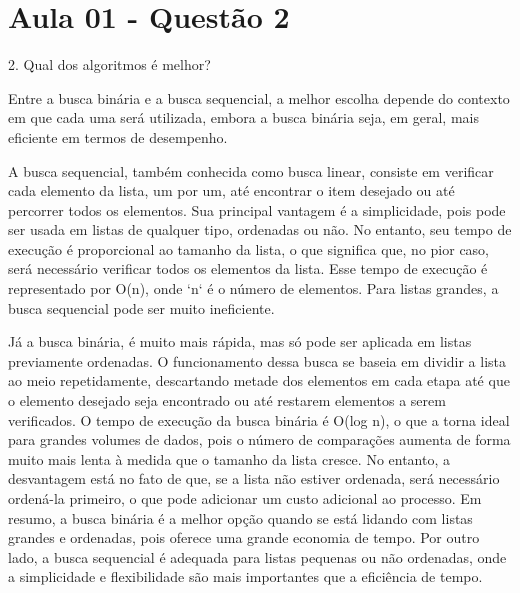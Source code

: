 \section{Aula 01 - Questão 2}

2. Qual dos algoritmos é melhor?

Entre a busca binária e a busca sequencial, a melhor escolha depende do contexto em que cada uma será utilizada, embora a busca binária seja, em geral, mais eficiente em termos de desempenho.

A busca sequencial, também conhecida como busca linear, consiste em verificar cada elemento da lista, um por um, até encontrar o item desejado ou até percorrer todos os elementos. Sua principal vantagem é a simplicidade, pois pode ser usada em listas de qualquer tipo, ordenadas ou não. No entanto, seu tempo de execução é proporcional ao tamanho da lista, o que significa que, no pior caso, será necessário verificar todos os elementos da lista. Esse tempo de execução é representado por O(n), onde `n` é o número de elementos. Para listas grandes, a busca sequencial pode ser muito ineficiente.

Já a busca binária, é muito mais rápida, mas só pode ser aplicada em listas previamente ordenadas. O funcionamento dessa busca se baseia em dividir a lista ao meio repetidamente, descartando metade dos elementos em cada etapa até que o elemento desejado seja encontrado ou até restarem elementos a serem verificados. O tempo de execução da busca binária é O(log n), o que a torna ideal para grandes volumes de dados, pois o número de comparações aumenta de forma muito mais lenta à medida que o tamanho da lista cresce. No entanto, a desvantagem está no fato de que, se a lista não estiver ordenada, será necessário ordená-la primeiro, o que pode adicionar um custo adicional ao processo.
Em resumo, a busca binária é a melhor opção quando se está lidando com listas grandes e ordenadas, pois oferece uma grande economia de tempo. Por outro lado, a busca sequencial é adequada para listas pequenas ou não ordenadas, onde a simplicidade e flexibilidade são mais importantes que a eficiência de tempo.

